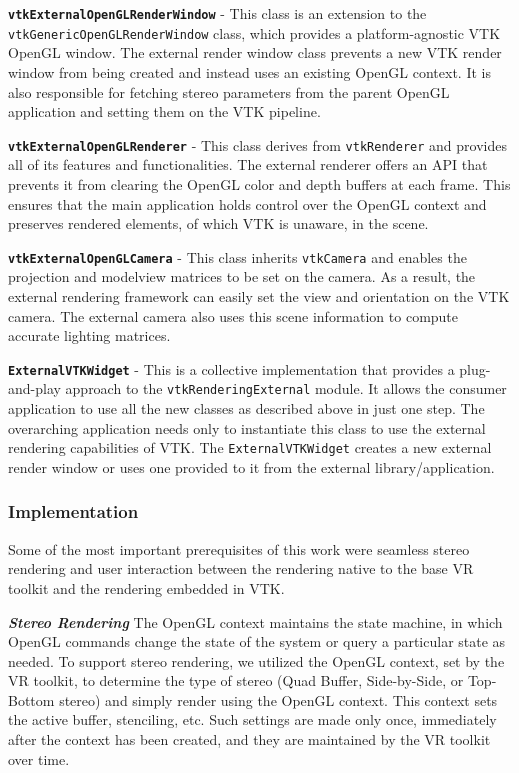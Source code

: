 \textbf{\texttt{vtkExternalOpenGLRenderWindow}} - This class is an extension to
the \texttt{vtkGenericOpenGLRenderWindow} class, which provides a
platform-agnostic VTK OpenGL window.
The external render window class prevents a new VTK render window from being
created and instead uses an existing OpenGL context.
It is also responsible for fetching stereo parameters from the parent OpenGL
application and setting them on the VTK pipeline.

\textbf{\texttt{vtkExternalOpenGLRenderer}} - This class derives from
\texttt{vtkRenderer} and provides all of its features and functionalities. The
external renderer offers an API that prevents it from clearing the OpenGL color
and depth buffers at each frame. This ensures that the main application holds
control over the OpenGL context and preserves rendered elements, of which VTK is unaware, in the scene.

\textbf{\texttt{vtkExternalOpenGLCamera}} - This class inherits
\texttt{vtkCamera} and enables the projection and modelview
matrices to be set on the camera. As a result, the external rendering framework can easily
set the view and orientation on the VTK camera. The external camera also uses
this scene information to compute accurate lighting matrices.

\textbf{\texttt{ExternalVTKWidget}} - This is a collective implementation that
provides a plug-and-play approach to the \texttt{vtkRenderingExternal} module.
It allows the consumer application to use all the new classes as described above
in just one step. The overarching application needs only to instantiate this
class to use the external rendering capabilities of VTK. The
\texttt{ExternalVTKWidget} creates a new external render window or uses one
provided to it from the external library/application.

\subsubsection{Implementation}

Some of the most important prerequisites of this work were seamless stereo
rendering and user interaction between the rendering native to the base VR toolkit and the rendering embedded in VTK. 

\textbf{\textit{Stereo Rendering}} The OpenGL context maintains the state machine, in which OpenGL commands change the state of the system or query a particular state as needed.
To support stereo rendering, we utilized the OpenGL context, set by the VR toolkit, to determine the type of stereo (Quad Buffer, Side-by-Side, or Top-Bottom stereo) and simply render using the OpenGL context. This context sets the active buffer, stenciling, etc.
Such settings are made only once, immediately after the context has been created, and they are maintained by the VR toolkit over time. 

